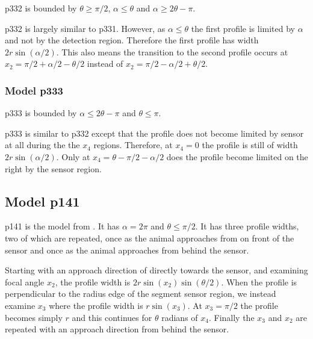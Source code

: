 p332 is bounded by $\theta \ge \pi/2$, $\alpha \le \theta$ and $\alpha \ge 2\theta -\pi$.

p332 is largely similar to p331. However, as $\alpha \le \theta$ the first profile is limited by $\alpha$ and not by the detection region. Therefore the first profile has width $2r\sin(\alpha /2)$. This also means the transition to the second profile occurs at  $x_2 = \pi/2 + \alpha/2 - \theta/2$ instead of  $x_2 = \pi/2 - \alpha/2 + \theta/2$.





\subsubsection{Model p333} \label{p333}

p333 is bounded by $\alpha \le 2\theta -\pi$ and $\theta \le \pi$.

p333 is similar to p332 except that the profile does not become limited by sensor at all during the the $x_4$ regions. Therefore, at $x_4 = 0 $ the profile is still of width $2r\sin(\alpha /2)$. Only at $x_4 = \theta - \pi/2 - \alpha/2$ does the profile become limited on the right by the sensor region.



\subsection{Model p141} \label{p141}

p141 is the model from \citep{rowcliffe2008estimating}. It has $\alpha =2\pi$ and $\theta \le \pi/2$. It has three profile widths, two of which are repeated, once as the animal approaches from on front of the sensor and once as the animal approaches from behind the sensor.

Starting with an approach direction of directly towards the sensor, and examining focal angle $x_2$, the profile width is $2r\sin(x_2)\sin(\theta/2)$. When the profile is perpendicular to the radius edge of the segment sensor region, we instead examine $x_3$ where the profile width is $r\sin(x_3)$. At $x_3=\pi/2$ the profile becomes simply $r$ and this continues for $\theta $ radians of $x_4$. Finally the $x_3$ and $x_2$ are repeated with an approach direction from behind the sensor. 



